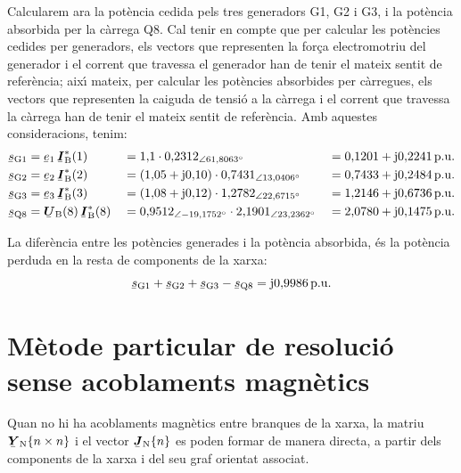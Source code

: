 \begin{exemple}
Calcularem ara la pot\`{e}ncia cedida pels tres generadors G1, G2 i G3, i la pot\`{e}ncia absorbida per la c\`{a}rrega Q8. Cal tenir en compte que per calcular les pot\`{e}ncies cedides per generadors, els vectors que representen la for\c{c}a electromotriu del generador i el corrent que travessa el generador han de tenir el mateix sentit de refer\`{e}ncia; aix\'{\i} mateix, per calcular les pot\`{e}ncies absorbides per c\`{a}rregues, els vectors que representen la caiguda de tensi\'{o} a la c\`{a}rrega i el corrent que travessa la c\`{a}rrega han de tenir el mateix sentit de refer\`{e}ncia. Amb aquestes consideracions, tenim:
\begin{alignat*}{3}
   \cmplx{s}\ped{G1} &= \cmplx{e}\ped{1} \, \mcmplx{I}\ped{B}^*(1) &&= 1{,}1 \cdot
    0{,}2312_{\angle 61{,}8063\degree} &&= 0{,}1201 + \ju 0{,}2241 \unit{p.u.} \\
   \cmplx{s}\ped{G2} &= \cmplx{e}\ped{2} \, \mcmplx{I}\ped{B}^*(2) &&=
   (1{,}05 + \ju 0{,}10) \cdot 0{,}7431_{\angle 13{,}0406\degree} &&=
   0{,}7433 + \ju 0{,}2484\unit{p.u.}   \\
   \cmplx{s}\ped{G3} &= \cmplx{e}\ped{3} \, \mcmplx{I}\ped{B}^*(3) &&=
   (1{,}08 + \ju 0{,}12) \cdot 1{,}2782_{\angle 22{,}6715\degree} &&=
   1{,}2146 + \ju 0{,}6736\unit{p.u.}   \\
   \cmplx{s}\ped{Q8} &= \mcmplx{U}\ped{B}(8) \, \mcmplx{I}\ped{B}^*(8) &&=
   0{,}9512_{\angle -19{,}1752\degree} \cdot 2{,}1901_{\angle          23{,}2362\degree}     &&= 2{,}0780 + \ju 0{,}1475\unit{p.u.}
\end{alignat*}

La difer\`{e}ncia entre les pot\`{e}ncies generades i la pot\`{e}ncia absorbida, \'{e}s la pot\`{e}ncia perduda en la resta de components de la xarxa:
\[
   \cmplx{s}\ped{G1} + \cmplx{s}\ped{G2} + \cmplx{s}\ped{G3} -
   \cmplx{s}\ped{Q8} = \ju 0{,}9986\unit{p.u.}
\]
\end{exemple}


\section{M\`{e}tode particular de resoluci\'{o} sense acoblaments magn\`{e}tics}

Quan no hi ha acoblaments magn\`{e}tics entre branques de la xarxa, la matriu $\mcmplx{Y}\ped{N}\{n \times n\}$ i el vector $\mcmplx{J}\ped{N}\{n\}$ es poden formar de manera directa, a partir dels components de la xarxa i del seu graf orientat associat.

